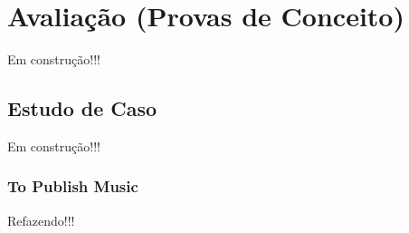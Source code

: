 \chapter{Avaliação (Provas de Conceito)}
\label{Evaluations}
Em construção!!!

\section{Estudo de Caso}%
%

Em construção!!!


\subsection{To Publish Music}%
%

Refazendo!!!

%

